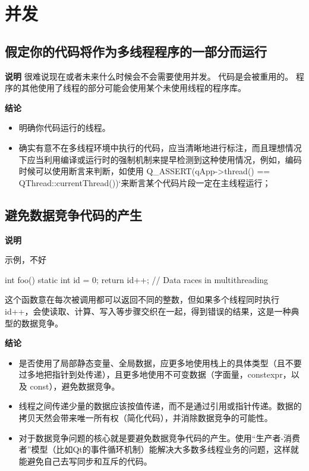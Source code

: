 \section{并发} \label{concurrency}

\subsection{假定你的代码将作为多线程程序的一部分而运行}

\textbf{说明}
很难说现在或者未来什么时候会不会需要使用并发。 代码是会被重用的。 程序的其他使用了线程的部分可能会使用某个未使用线程的程序库。

\textbf{结论}

\begin{itemize}
  \item 明确你代码运行的线程。
  \item 确实有意不在多线程环境中执行的代码，应当清晰地进行标注，而且理想情况下应当利用编译或运行时的强制机制来提早检测到这种使用情况，例如，编码时候可以使用断言来判断，如使用 Q\_ASSERT(qApp->thread() == QThread::currentThread())`来断言某个代码片段一定在主线程运行；
\end{itemize}


\subsection{避免数据竞争代码的产生}

\textbf{说明}

示例，不好

\begin{ccode} 
int foo() {
    static int id = 0;
    return id++;        // Data races in multithreading
}
\end{ccode}

这个函数意在每次被调用都可以返回不同的整数，但如果多个线程同时执行 id++，会使读取、计算、写入等步骤交织在一起，得到错误的结果，这是一种典型的数据竞争。

\textbf{结论}

\begin{itemize}
  \item 是否使用了局部静态变量、全局数据，应更多地使用栈上的具体类型（且不要过多地把指针到处传递），且更多地使用不可变数据（字面量，constexpr，以及 const），避免数据竞争。
  \item 线程之间传递少量的数据应该按值传递，而不是通过引用或指针传递。数据的拷贝天然会带来唯一所有权（简化代码），并消除数据竞争的可能性。
  \item 对于数据竞争问题的核心就是要避免数据竞争代码的产生。使用“生产者-消费者”模型（比如Qt的事件循环机制）能解决大多数多线程业务的问题，这样就能避免自己去写同步和互斥的代码。
\end{itemize}

